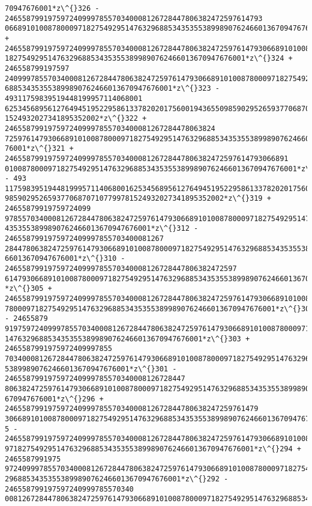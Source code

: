 \documentclass[11pt]{article}
\begin{document}
\begin{tcolorbox}[breakable, size=fbox, boxrule=.5pt, pad at break*=1mm, opacityfill=0]
\begin{Verbatim}[commandchars=\\\{\}]
70947676001*z\^{}326 - 246558799197597240999785570340008126728447806382472597614793
06689101008780009718275492951476329688534353553899890762466013670947676001*z\^{}325
+ 246558799197597240999785570340008126728447806382472597614793066891010087800097
18275492951476329688534353553899890762466013670947676001*z\^{}324 + 246558799197597
24099978557034000812672844780638247259761479306689101008780009718275492951476329
688534353553899890762466013670947676001*z\^{}323 - 49311759839519448199957114068001
62534568956127649451952295861337820201756001943655098590295265937706870710779978
1524932027341895352002*z\^{}322 + 2465587991975972409997855703400081267284478063824
72597614793066891010087800097182754929514763296885343535538998907624660136709476
76001*z\^{}321 + 246558799197597240999785570340008126728447806382472597614793066891
01008780009718275492951476329688534353553899890762466013670947676001*z\^{}320 - 493
11759839519448199957114068001625345689561276494519522958613378202017560019436550
985902952659377068707107799781524932027341895352002*z\^{}319 + 24655879919759724099
97855703400081267284478063824725976147930668910100878000971827549295147632968853
4353553899890762466013670947676001*z\^{}312 - 2465587991975972409997855703400081267
28447806382472597614793066891010087800097182754929514763296885343535538998907624
66013670947676001*z\^{}310 - 246558799197597240999785570340008126728447806382472597
61479306689101008780009718275492951476329688534353553899890762466013670947676001
*z\^{}305 + 24655879919759724099978557034000812672844780638247259761479306689101008
780009718275492951476329688534353553899890762466013670947676001*z\^{}304 - 24655879
91975972409997855703400081267284478063824725976147930668910100878000971827549295
1476329688534353553899890762466013670947676001*z\^{}303 + 2465587991975972409997855
70340008126728447806382472597614793066891010087800097182754929514763296885343535
53899890762466013670947676001*z\^{}301 - 246558799197597240999785570340008126728447
80638247259761479306689101008780009718275492951476329688534353553899890762466013
670947676001*z\^{}296 + 24655879919759724099978557034000812672844780638247259761479
306689101008780009718275492951476329688534353553899890762466013670947676001*z\^{}29
5 - 2465587991975972409997855703400081267284478063824725976147930668910100878000
9718275492951476329688534353553899890762466013670947676001*z\^{}294 + 2465587991975
97240999785570340008126728447806382472597614793066891010087800097182754929514763
29688534353553899890762466013670947676001*z\^{}292 - 246558799197597240999785570340
00812672844780638247259761479306689101008780009718275492951476329688534353553899

\end{Verbatim}
\end{tcolorbox}
\end{document}
